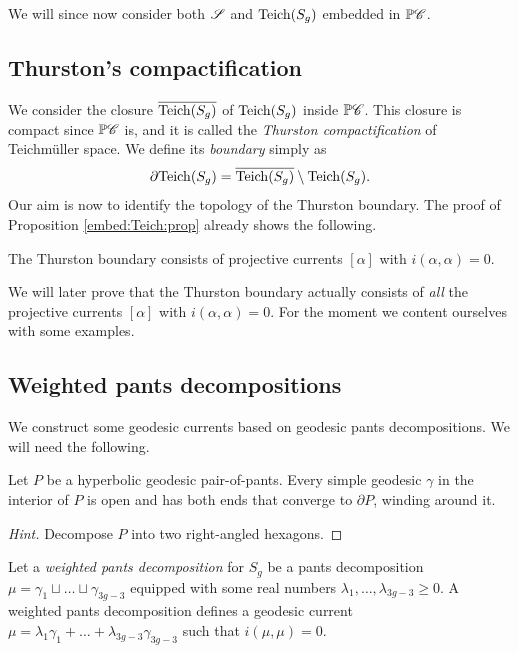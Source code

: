 We will since now consider both $\mathscr{S}$ and ${\rm Teich}(S_g)$ embedded in $\mathbb{P}\mathscr{C}$. 

\subsection{Thurston's compactification}
We consider the closure $\overline{{\rm Teich}(S_g)}$ of ${\rm Teich}(S_g)$ inside $\mathbb{P}\mathscr{C}$. This closure is compact since $\mathbb{P}\mathscr{C}$ is, and it is called the \emph{Thurston compactification} of Teichm\"uller space. We define its \emph{boundary} simply as
$$\partial{\rm Teich}(S_g) = \overline{{\rm Teich}(S_g)} \setminus {\rm Teich}(S_g).$$ 
Our aim is now to identify the topology of the Thurston boundary.
The proof of Proposition \ref{embed:Teich:prop} already shows the following.

\begin{prop} \label{alpha:zero:prop}
The Thurston boundary consists of projective currents $[\alpha]$ with $i(\alpha,\alpha)=0$.
\end{prop}

We will later prove that the Thurston boundary actually consists of \emph{all} the projective currents $[\alpha]$ with $i(\alpha,\alpha)=0$. For the moment we content ourselves with some examples. 

\subsection{Weighted pants decompositions}
We construct some geodesic currents based on geodesic pants decompositions. We will need the following.

\begin{ex} \label{pants:simple:line:ex}
Let $P$ be a hyperbolic geodesic pair-of-pants. Every simple geodesic $\gamma$ in the interior of $P$ is open and has both ends that converge to $\partial P$, winding around it.
\end{ex}
\begin{proof}[Hint]
Decompose $P$ into two right-angled hexagons.
\end{proof}

Let a \emph{weighted pants decomposition} for $S_g$ be a pants decomposition $\mu = \gamma_1 \sqcup \ldots \sqcup \gamma_{3g-3}$ equipped with some real numbers $\lambda_1,\ldots,\lambda_{3g-3}\geqslant 0$. A weighted pants decomposition defines a geodesic current $\mu = \lambda_1\gamma_1+\ldots + \lambda_{3g-3}\gamma_{3g-3}$ such that $i(\mu,\mu)=0$. 

